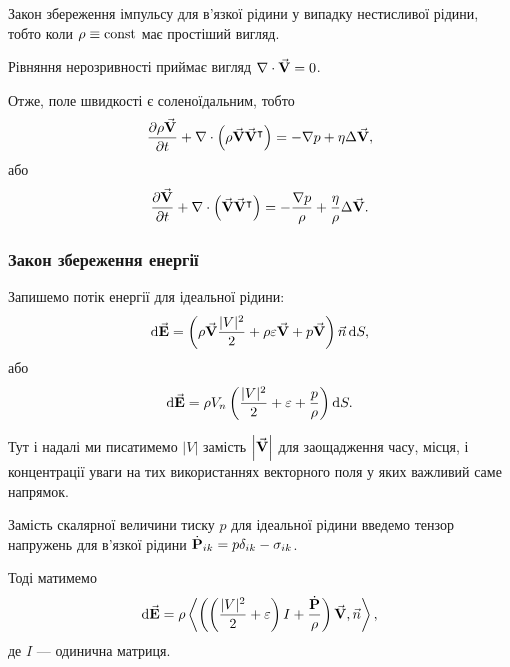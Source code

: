 \begin{remark}
	Закон збереження імпульсу для в'язкої рідини у випадку нестисливої рідини, тобто коли $\rho \equiv \const$ має простіший вигляд.
\end{remark}
	
Рівняння нерозривності приймає вигляд $\nabla \cdot \vecf V = 0$. \medskip

Отже, поле швидкості є соленоїдальним, тобто
\begin{equation}
	\frac{\partial \rho \vecf V}{\partial t} + \nabla \cdot \Big(\rho \vecf V \vecf V^\intercal\Big) = - \nabla p + \eta \Delta \vecf V,
\end{equation}
або
\begin{equation}
	\frac{\partial \vecf V}{\partial t} + \nabla \cdot \Big(\vecf V \vecf V^\intercal\Big) = - \frac{\nabla p}{\rho} + \frac{\eta}{\rho} \Delta \vecf V.
\end{equation}

\subsubsection{Закон збереження енергії}

Запишемо потік енергії для ідеальної рідини:
\begin{equation}
	\diff \vecf E = \left( \rho \vecf V \frac{|V|^2}{2} + \rho \epsilon \vecf V + p \vecf V\right) \vec n \diff S,
\end{equation}
або
\begin{equation}
	\diff \vecf E = \rho V_n \left( \frac{|V|^2}{2} + \epsilon + \frac{p}{\rho}\right)\diff S.
\end{equation}

\begin{remark}
	Тут і надалі ми писатимемо $|V|$ замість $\left|\vecf V\right|$ для заощадження часу, місця, і концентрації уваги на тих використаннях векторного поля у яких важливий саме напрямок.
\end{remark}

Замість скалярної величини тиску $p$ для ідеальної рідини введемо тензор напружень для в'язкої рідини $\dot{\bf{P}}_{ik} = p \delta_{ik} - \sigma_{ik}$. \medskip

Тоді матимемо 
\begin{equation}
	\diff \vecf E = \rho \langle\left(\left( \frac{|V|^2}{2} + \epsilon \right) I + \frac{\dot{\bf{P}}}{\rho} \right)\vecf V, \vec n \rangle,
\end{equation}
де $I$ --- одинична матриця. \medskip


